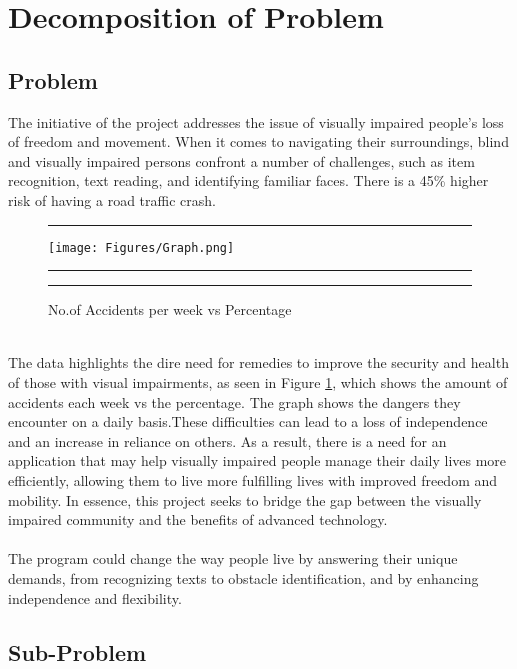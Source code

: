 \documentclass[MScCS]{uccthesis}
\begin{document}
\section{Decomposition of Problem}

\subsection{Problem}
The initiative of the project addresses the issue of visually impaired people's loss of freedom and movement. When it comes to navigating their surroundings, blind and visually impaired persons confront a number of challenges, such as item recognition, text reading, and identifying familiar faces. There is a 45\% higher risk of having a road traffic crash.
\begin{figure}[hbtp]
      \hrule
      \vspace{0.5em}
     \centering
      \texttt{[image: Figures/Graph.png]}
      \vspace{0.5em}
      \hrule
      \caption{\label{fig:including@a@picture}No.of Accidents per week vs Percentage }
      \vspace{0.5em}
      \hrule
   \end{figure}
\\
The data highlights the dire need for remedies to improve the security and health of those with visual impairments, as seen in Figure \ref{fig:including@a@picture}, which shows the amount of accidents each week vs the percentage. The graph shows the dangers they encounter on a daily basis.These difficulties can lead to a loss of independence and an increase in reliance on others. As a result, there is a need for an application that may help visually impaired people manage their daily lives more efficiently, allowing them to live more fulfilling lives with improved freedom and mobility. In essence, this project seeks to bridge the gap between the visually impaired community and the benefits of advanced technology. \\
\\
The program could change the way people live by answering their unique demands, from recognizing texts to obstacle identification, and by enhancing independence and flexibility.

\subsection{Sub-Problem}
\end{document}
